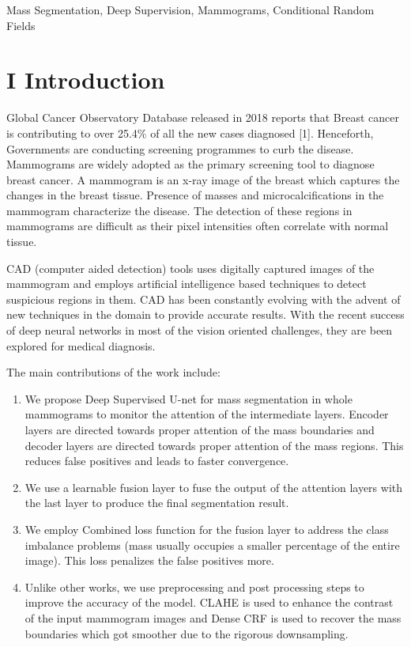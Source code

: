 \documentclass[review]{elsarticle}
\newcommand{\<}{${<}$}
\begin{document}
\begin{frontmatter}
\begin{keyword}
 Mass Segmentation, Deep Supervision, Mammograms, Conditional Random Fields
\end{keyword}

\end{frontmatter}

\linenumbers

\section{I Introduction }

Global Cancer Observatory Database released in 2018 reports that Breast cancer is contributing to over 25.4\% of all the new cases diagnosed \citep{}[1].  Henceforth, Governments are conducting screening programmes to curb the disease. Mammograms are widely adopted as  the primary screening tool to diagnose breast cancer. A mammogram is an x-ray image of the breast which captures the changes in the breast tissue. Presence of masses and microcalcifications in the mammogram characterize the disease. The detection of these regions in mammograms are difficult as their pixel intensities often correlate with normal tissue. 

CAD (computer aided detection) tools uses digitally captured images of the mammogram and employs artificial intelligence based techniques to detect suspicious regions in them. CAD has been constantly evolving with the advent of new techniques in the domain to provide accurate results. With the recent success of deep neural networks in most of the vision oriented challenges, they are been explored for medical diagnosis. 

The main contributions of the work include:
\begin{enumerate}
   \item We propose Deep Supervised U-net for mass segmentation in whole mammograms to monitor the attention of the intermediate layers.  Encoder layers are directed towards proper attention of the mass boundaries and decoder layers are directed towards proper attention of the mass regions. This reduces false positives and leads to faster convergence.
   \item We use a learnable fusion layer to fuse the output of the attention layers with the last layer to produce the final segmentation result.
   \item We employ Combined loss function for the fusion layer to address the class imbalance problems (mass usually occupies a smaller percentage of the entire image). This loss penalizes the false positives more.
     \item Unlike other works, we use preprocessing and post processing steps to improve the accuracy of the model. CLAHE is used to enhance the contrast of the input mammogram images and Dense CRF is used to recover the mass boundaries which got smoother due to the rigorous downsampling.
\end{enumerate}
\end{document}
